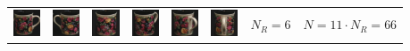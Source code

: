 \documentclass[dutch]{beamer}
\theoremstyle{definition}
\theoremstyle{remark}
\theoremstyle{example}
\begin{document}
{\begin{center}
\begin{tabular}{c@{\ }c@{}c@{}c@{}c@{}c c@{\ }c@{}c@{}c@{}c@{}c}
\includegraphics[width=0.8cm]{coil/beeld-60.eps} &
\includegraphics[width=0.8cm]{coil/beeld-61.eps} &
\includegraphics[width=0.8cm]{coil/beeld-62.eps} &
\includegraphics[width=0.8cm]{coil/beeld-63.eps} &
\includegraphics[width=0.8cm]{coil/beeld-64.eps} &
\includegraphics[width=0.8cm]{coil/beeld-65.eps} &
\multicolumn{2}{c}{$N_R = 6$} & 
\multicolumn{4}{c}{$N = 11 \cdot N_R = 66$}

\end{tabular}
\end{center}

}
\frame
\end{document}
